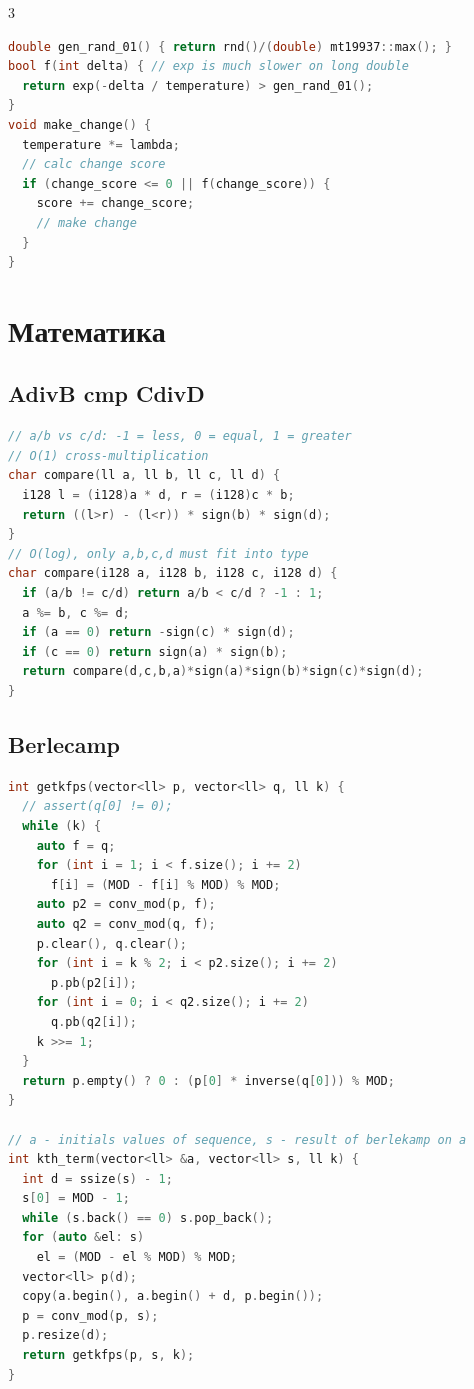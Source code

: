 \documentclass[8pt,a4paper,landscape,twosided]{extarticle}
\begin{document}
\begin{multicols*}{3}
\begin{lstlisting}[language=C++]
double gen_rand_01() { return rnd()/(double) mt19937::max(); }
bool f(int delta) { // exp is much slower on long double
  return exp(-delta / temperature) > gen_rand_01();
}
void make_change() {
  temperature *= lambda;
  // calc change score
  if (change_score <= 0 || f(change_score)) {
    score += change_score;
    // make change
  }
}
\end{lstlisting}

\section{Математика}

\subsection{AdivB cmp CdivD}
\begin{lstlisting}[language=C++]
// a/b vs c/d: -1 = less, 0 = equal, 1 = greater
// O(1) cross-multiplication
char compare(ll a, ll b, ll c, ll d) {
  i128 l = (i128)a * d, r = (i128)c * b;
  return ((l>r) - (l<r)) * sign(b) * sign(d);
}
// O(log), only a,b,c,d must fit into type
char compare(i128 a, i128 b, i128 c, i128 d) {
  if (a/b != c/d) return a/b < c/d ? -1 : 1;
  a %= b, c %= d;
  if (a == 0) return -sign(c) * sign(d);
  if (c == 0) return sign(a) * sign(b);
  return compare(d,c,b,a)*sign(a)*sign(b)*sign(c)*sign(d);
}
\end{lstlisting}

\subsection{Berlecamp}
\begin{lstlisting}[language=C++]
int getkfps(vector<ll> p, vector<ll> q, ll k) {
  // assert(q[0] != 0);
  while (k) {
    auto f = q;
    for (int i = 1; i < f.size(); i += 2)
      f[i] = (MOD - f[i] % MOD) % MOD;
    auto p2 = conv_mod(p, f);
    auto q2 = conv_mod(q, f);
    p.clear(), q.clear();
    for (int i = k % 2; i < p2.size(); i += 2)
      p.pb(p2[i]);
    for (int i = 0; i < q2.size(); i += 2)
      q.pb(q2[i]);
    k >>= 1;
  }
  return p.empty() ? 0 : (p[0] * inverse(q[0])) % MOD;
}

// a - initials values of sequence, s - result of berlekamp on a
int kth_term(vector<ll> &a, vector<ll> s, ll k) {
  int d = ssize(s) - 1;
  s[0] = MOD - 1;
  while (s.back() == 0) s.pop_back();
  for (auto &el: s)
    el = (MOD - el % MOD) % MOD;
  vector<ll> p(d);
  copy(a.begin(), a.begin() + d, p.begin());
  p = conv_mod(p, s);
  p.resize(d);
  return getkfps(p, s, k);
}


\end{lstlisting}
\end{multicols*}
\end{document}

